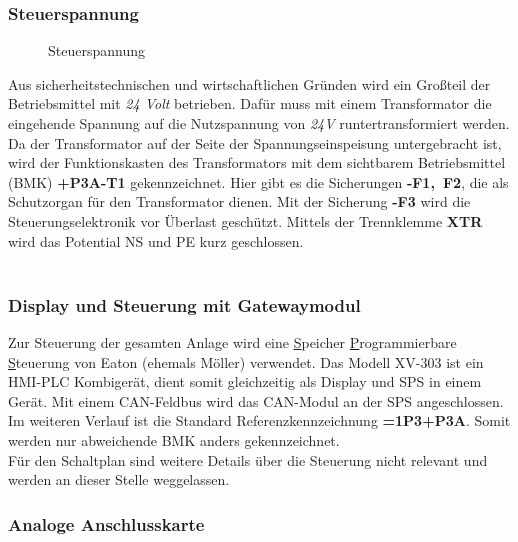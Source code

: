 \documentclass[12pt,a4paper]{scrartcl}	%
\begin{document}
\subsubsection{Steuerspannung}
\begin{wrapfigure}[]{l}[-0.5cm]{5cm}
	\caption{Steuerspannung}
\end{wrapfigure}
Aus sicherheitstechnischen und wirtschaftlichen Gründen wird ein Großteil der Betriebsmittel mit \textit{24 Volt} betrieben. Dafür muss mit einem Transformator die eingehende Spannung auf die Nutzspannung von \textit{24V} runtertransformiert werden. Da der Transformator auf der Seite der Spannungseinspeisung untergebracht ist, wird der Funktionskasten des Transformators mit dem sichtbarem Betriebsmittel (BMK) \mbox{\textbf{+P3A-T1}} gekennzeichnet. Hier gibt es die Sicherungen \mbox{\textbf{-F1, F2}}, die als Schutzorgan für den Transformator dienen. Mit der Sicherung \mbox{\textbf{-F3}} wird die Steuerungselektronik vor Überlast geschützt. Mittels der Trennklemme \mbox{\textbf{XTR}} wird das Potential NS und PE kurz geschlossen.
\\
\\

\subsubsection{Display und Steuerung mit Gatewaymodul}

Zur Steuerung der gesamten Anlage wird eine \underline{S}peicher \underline{P}rogrammierbare \underline{S}teuerung von Eaton (ehemals Möller) verwendet.
Das Modell XV-303  ist ein HMI-PLC Kombigerät, dient somit gleichzeitig als Display und SPS in einem Gerät. Mit einem CAN-Feldbus wird das CAN-Modul an der SPS angeschlossen. Im weiteren Verlauf ist die Standard Referenzkennzeichnung \mbox{\textbf{=1P3+P3A}}. Somit werden nur abweichende BMK anders gekennzeichnet.\\
 Für den Schaltplan sind weitere Details über die Steuerung nicht relevant und werden an dieser Stelle weggelassen.


\subsubsection{Analoge Anschlusskarte}\label{analog}
\end{document}
